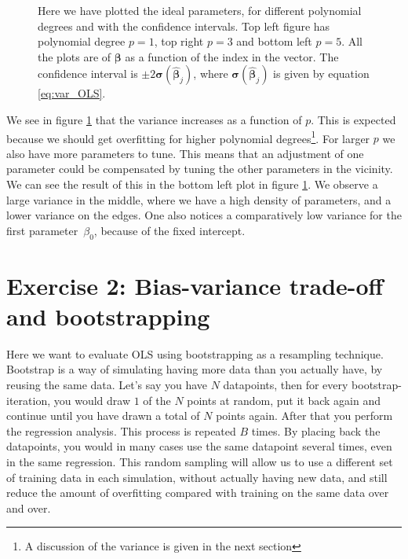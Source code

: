 \documentclass[reprint,english,notitlepage,aps,nobalancelastpage,nofootinbib]{revtex4-1}  %
\begin{document}
\begin{figure}[H]
	\endminipage\hfill
	\caption{Here we have plotted the ideal parameters, for different polynomial degrees and with the confidence intervals. Top left figure has polynomial degree $p = 1$, top right $p = 3$ and bottom left $p = 5$. All the plots are of $\boldsymbol{\beta}$ as a function of the index in the vector. The confidence interval is $\pm 2\boldsymbol{\sigma}(\boldsymbol{\hat{\beta}}_{j})$, where $\boldsymbol{\sigma}(\boldsymbol{\hat{\beta}}_{j})$ is given by equation \eqref{eq:var_OLS}.} \label{fig:var_beta}
	\endminipage
\end{figure}
We see in figure \ref{fig:var_beta} that the variance increases as a function of $p$. This is expected because we should get overfitting for higher polynomial degrees\footnote{A discussion of the variance is given in the next section}. For larger $p$ we also have more parameters to tune. This means that an adjustment of one parameter could be compensated by tuning the other parameters in the vicinity. We can see the result of this in the bottom left plot in figure \ref{fig:var_beta}. We observe a large variance in the middle, where we have a high density of parameters, and a lower variance on the edges. One also notices a comparatively low variance for the first parameter $\beta_0$, because of the fixed intercept.


\section*{Exercise 2: Bias-variance trade-off and bootstrapping}

Here we want to evaluate OLS using bootstrapping as a resampling technique. Bootstrap is a way of simulating having more data than you actually have, by reusing the same data. Let's say you have $N$ datapoints, then for every bootstrap-iteration, you would draw $1$ of the $N$ points at random, put it back again and continue until you have drawn a total of $N$ points again. After that you perform the regression analysis. This process is repeated $B$ times. By placing back the datapoints, you would in many cases use the same datapoint several times, even in the same regression. This random sampling will allow us to use a different set of training data in each simulation, without actually having new data, and still reduce the amount of overfitting compared with training on the same data over and over.
\end{document}
